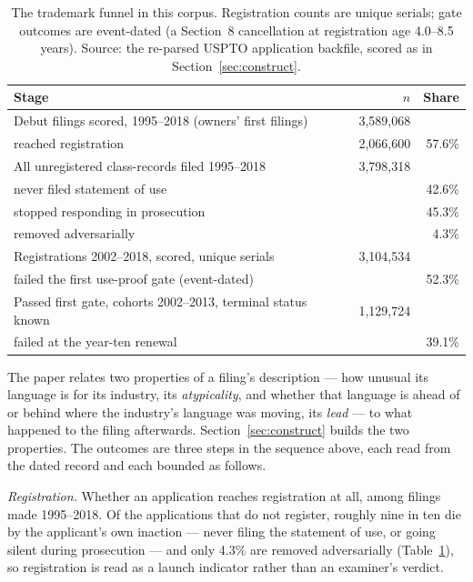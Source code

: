 \documentclass[11pt]{article}
\begin{document}
\begin{table}[h]\centering\small
\caption{The trademark funnel in this corpus. Registration counts are
unique serials; gate outcomes are event-dated (a Section~8 cancellation
at registration age 4.0--8.5 years). Source: the re-parsed USPTO
application backfile, scored as in Section~\ref{sec:construct}.}
\label{tab:funnel}
\begin{tabular}{lrr}
\toprule
Stage & $n$ & Share \\
\midrule
Debut filings scored, 1995--2018 (owners' first filings) & 3{,}589{,}068 & \\
\quad reached registration & 2{,}066{,}600 & 57.6\% \\
\midrule
All unregistered class-records filed 1995--2018 & 3{,}798{,}318 & \\
\quad never filed statement of use & & 42.6\% \\
\quad stopped responding in prosecution & & 45.3\% \\
\quad removed adversarially & & 4.3\% \\
\midrule
Registrations 2002--2018, scored, unique serials & 3{,}104{,}534 & \\
\quad failed the first use-proof gate (event-dated) & & 52.3\% \\
\midrule
Passed first gate, cohorts 2002--2013, terminal status known & 1{,}129{,}724 & \\
\quad failed at the year-ten renewal & & 39.1\% \\
\bottomrule
\end{tabular}
\end{table}

The paper relates two properties of a filing's description --- how unusual
its language is for its industry, its \emph{atypicality}, and whether that
language is ahead of or behind where the industry's language was moving, its
\emph{lead} --- to what happened to the filing afterwards. Section~\ref{sec:construct}
builds the two properties. The outcomes are three steps in the sequence above,
each read from the dated record and each bounded as follows.

\emph{Registration.} Whether an application reaches registration at all,
among filings made 1995--2018. Of the applications that do not register,
roughly nine in ten die by the applicant's own inaction --- never filing the statement of use, or going
silent during prosecution --- and only 4.3\% are removed adversarially
(Table~\ref{tab:funnel}), so registration is read as a launch indicator rather
than an examiner's verdict.
\end{document}
